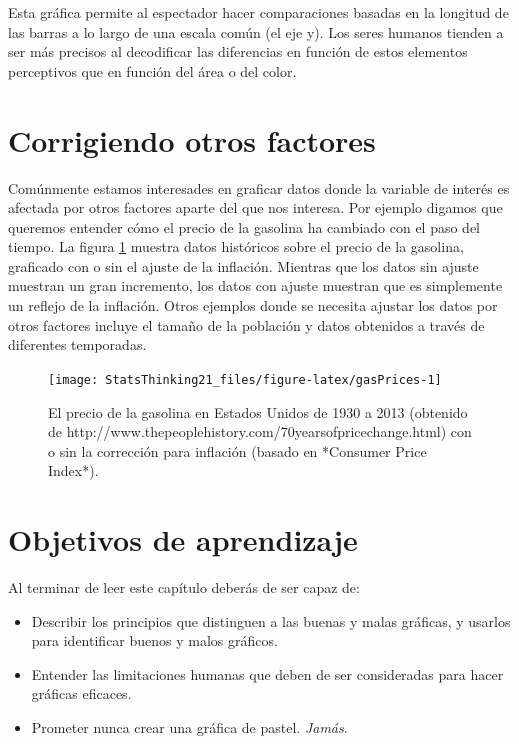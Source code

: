 \documentclass[
  12pt,
]{book}
\providecommand{\tightlist}{%
  \setlength{\itemsep}{0pt}\setlength{\parskip}{0pt}}
\begin{document}
Esta gráfica permite al espectador hacer comparaciones basadas en la longitud de las barras a lo largo de una escala común (el eje y). Los seres humanos tienden a ser más precisos al decodificar las diferencias en función de estos elementos perceptivos que en función del área o del color.

\hypertarget{corrigiendo-otros-factores}{%
\section{Corrigiendo otros factores}\label{corrigiendo-otros-factores}}

Comúnmente estamos interesades en graficar datos donde la variable de interés es afectada por otros factores aparte del que nos interesa. Por ejemplo digamos que queremos entender cómo el precio de la gasolina ha cambiado con el paso del tiempo. La figura \ref{fig:gasPrices} muestra datos históricos sobre el precio de la gasolina, graficado con o sin el ajuste de la inflación. Mientras que los datos sin ajuste muestran un gran incremento, los datos con ajuste muestran que es simplemente un reflejo de la inflación. Otros ejemplos donde se necesita ajustar los datos por otros factores incluye el tamaño de la población y datos obtenidos a través de diferentes temporadas.

\begin{figure}
\texttt{[image: StatsThinking21\_files/figure-latex/gasPrices-1]} \caption{El precio de la gasolina en Estados Unidos de 1930 a 2013 (obtenido de http://www.thepeoplehistory.com/70yearsofpricechange.html) con o sin la corrección para inflación (basado en *Consumer Price Index*).}\label{fig:gasPrices}
\end{figure}

\hypertarget{objetivos-de-aprendizaje-3}{%
\section{Objetivos de aprendizaje}\label{objetivos-de-aprendizaje-3}}

Al terminar de leer este capítulo deberás de ser capaz de:

\begin{itemize}
\tightlist
\item
  Describir los principios que distinguen a las buenas y malas gráficas, y usarlos para identificar buenos y malos gráficos.
\item
  Entender las limitaciones humanas que deben de ser consideradas para hacer gráficas eficaces.
\item
  Prometer nunca crear una gráfica de pastel. \emph{Jamás}.
\end{itemize}
\end{document}
